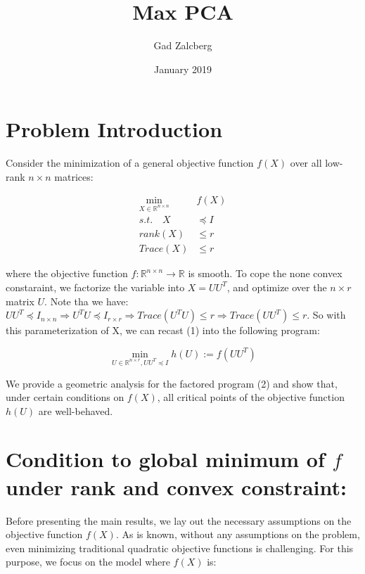 \documentclass{article}
\title{Max PCA}
\author{Gad Zalcberg }
\date{January 2019}
\begin{document}
\maketitle

\section{Problem Introduction}
Consider the minimization of a general objective function
$f(X)$ over all low-rank $n\times n$ matrices:

\begin{equation}
\begin{split}
\min_{X\in \mathbb{R}^{n\times n}} & f\left(X\right)\\
s.t.\quad X & \preceq I\\
rank\left(X\right) &\le r\\
Trace\left(X\right) &\le r
\end{split}
\end{equation}

where the objective function $f:\mathbb{R}^{n\times n} \rightarrow \mathbb{R}$ is smooth.
To cope the none convex constaraint, we factorize the variable into $X = U U^T$, and optimize over the $n \times r$ matrix $U$. Note tha we have: $UU^T\preceq I_{n\times n}\Rightarrow U^TU\preceq I_{r\times r}\Rightarrow Trace\left(U^TU\right)\le r\Rightarrow Trace\left(UU^T\right)\le r$. So with this parameterization of X, we can recast (1) into the following program:

\begin{equation}
    \min_{U\in \mathbb{R}^{n\times r}, UU^T\preceq I} h\left(U\right):=f\left(UU^T\right)
\end{equation}

We provide a geometric analysis for the factored program (2) and show that, under certain conditions on $f(X)$, all critical points of the objective function $h\left(U\right)$ are well-behaved.


\section{Condition to global minimum of $f$ under rank and convex constraint:}

Before presenting the main results, we lay out the necessary assumptions on the objective function $f(X)$. As is known, without any assumptions on the problem, even minimizing traditional quadratic objective functions is challenging. For this purpose, we focus on the model where $f(X)$ is:
\end{document}

